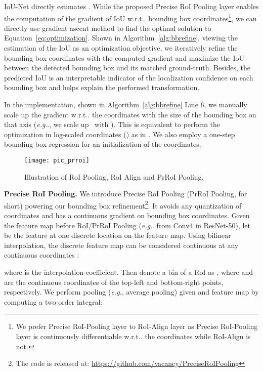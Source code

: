 \documentclass[runningheads]{llncs}
\makeatletter
\newcommand{\myparagraph}[1]{{\noindent \bf #1}}
\DeclareRobustCommand\onedot{\futurelet\@let@token\@onedot}
\def\@onedot{\ifx\@let@token.\else.\null\fi\xspace}
\def\eg{\emph{e.g}\onedot} \def\Eg{\emph{E.g}\onedot}
\def\wrt{w.r.t\onedot} \def\dof{d.o.f\onedot}
\makeatother
\begin{document}
IoU-Net directly estimates . While the proposed Precise RoI Pooling layer enables the computation of the gradient of IoU \wrt bounding box coordinates\footnote{We prefer Precise RoI-Pooling layer to RoI-Align layer \cite{he2017mask} as Precise RoI-Pooling layer is continuously differentiable \wrt the coordinates while RoI-Align is not.}, we can directly use gradient ascent method to find the optimal solution to Equation~\ref{eq:optimization}. Shown in Algorithm~\ref{alg:bbrefine}, viewing the estimation of the IoU as an optimization objective, we iteratively refine the bounding box coordinates with the computed gradient and maximize the IoU between the detected bounding box and its matched ground-truth. Besides, the predicted IoU is an interpretable indicator of the localization confidence on each bounding box and helps explain the performed transformation.

In the implementation, shown in Algorithm~\ref{alg:bbrefine} Line 6, we manually scale up the gradient \wrt the coordinates with the size of the bounding box on that axis (\eg, we scale up ~with ). This is equivalent to perform the optimization in log-scaled coordinates () as in \cite{dollar2014fast}. We also employ a one-step bounding box regression for an initialization of the coordinates.

\begin{figure}[t]
       \centering
    \texttt{[image: pic\_prroi]}
    \caption{Illustration of RoI Pooling, RoI Align and PrRoI Pooling.}
    \label{fig:prroi}
    \vspace{-0.5em}
\end{figure}

\vspace{1em}
\myparagraph{Precise RoI Pooling.}
\newcommand{\prpool}{\mathrm{PrPool}}
We introduce Precise RoI Pooling (PrRoI Pooling, for short) powering our bounding box refinement\footnote{The code is released at: \url{https://github.com/vacancy/PreciseRoIPooling}}. It avoids any quantization of coordinates and has a continuous gradient on bounding box coordinates. Given the feature map  before RoI/PrRoI Pooling (\eg from Conv4 in ResNet-50), let  be the feature at one discrete location  on the feature map. Using bilinear interpolation, the discrete feature map can be considered continuous at any continuous coordinates :

where  is the interpolation coefficient. Then denote a bin of a RoI as , where  and  are the continuous coordinates of the top-left and bottom-right points, respectively. We perform pooling ({\it e.g.}, average pooling) given  and feature map  by computing a two-order integral:
\end{document}
